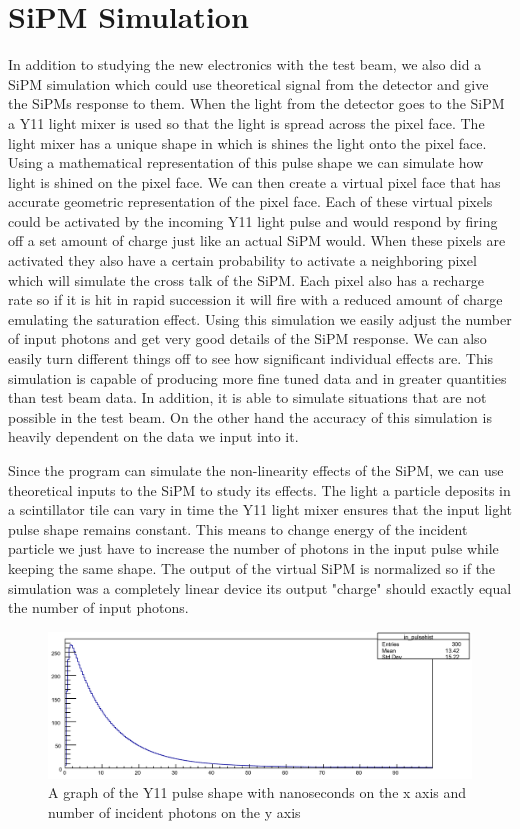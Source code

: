 \section{SiPM Simulation}

In addition to studying the new electronics with the test beam, we also did a SiPM simulation which could use theoretical signal from the detector and give the SiPMs response to them. When the light from the detector goes to the SiPM a Y11 light mixer is used so that the light is spread across the pixel face. The light mixer has a unique shape in which is shines the light onto the pixel face. Using a mathematical representation of this pulse shape we can simulate how light is shined on the pixel face. We can then create a virtual pixel face that has accurate geometric representation of the pixel face. Each of these virtual pixels could be activated by the incoming Y11 light pulse and would respond by firing off a set amount of charge just like an actual SiPM would. When these pixels are activated they also have a certain probability to activate a neighboring pixel which will simulate the cross talk of the SiPM. Each pixel also has a recharge rate so if it is hit in rapid succession it will fire with a reduced amount of charge emulating the saturation effect. Using this simulation we easily adjust the number of input photons and get very good details of the SiPM response. We can also easily turn different things off to see how significant individual effects are. This simulation is capable of producing more fine tuned data and in greater quantities than test beam data. In addition, it is able to simulate situations that are not possible in the test beam. On the other hand the accuracy of this simulation is heavily dependent on the data we input into it.

Since the program can simulate the non-linearity effects of the SiPM, we can use theoretical inputs to the SiPM to study its effects. The light a particle deposits in a scintillator tile can vary in time the Y11 light mixer ensures that the input light pulse shape remains constant. This means to change energy of the incident particle we just have to increase the number of photons in the input pulse while keeping the same shape. The output of the virtual SiPM is normalized so if the simulation was a completely linear device its output "charge" should exactly equal the number of input photons. 

\begin{figure}
\centering
\includegraphics[width=\linewidth]{Figures/Y11.png}
\caption{A graph of the Y11 pulse shape with nanoseconds on the x axis and number of incident photons on the y axis}
\label{fig:Y11}
\end{figure}

